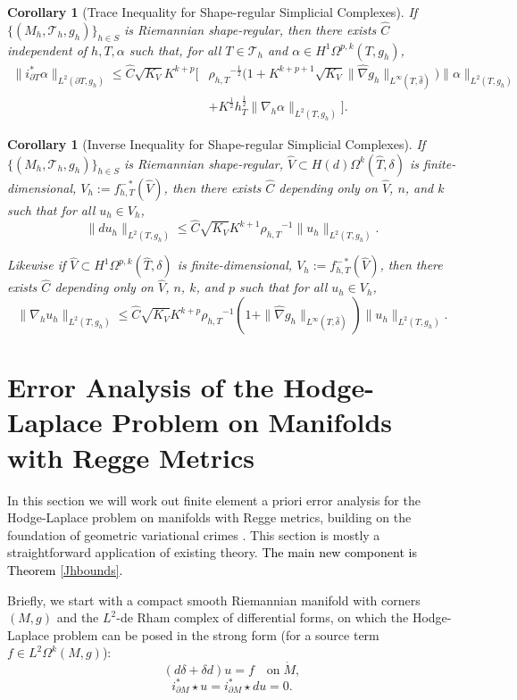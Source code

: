 \documentclass[11pt]{article}
\newtheorem{corollary}[theorem]{Corollary}
\newcommand{\correction}[2]{\textcolor{red}{}\textcolor{black}{#2}}
\begin{document}
\begin{corollary}[Trace Inequality for Shape-regular Simplicial Complexes]
\label{shaperegtrace}
If $\{(M_h,\mathcal{T}_h,g_h)\}_{h \in S}$ is Riemannian shape-regular, then there exists $\hat C$ independent of $h,T, \alpha$ such that, for all $T \in \mathcal{T}_h$ and $\alpha \in H^1\Omega^{p,k}(T,g_h)$,
\begin{align*}
\|i_{\partial T}^*\alpha\|_{L^2(\partial T,g_h)} \le \hat C \sqrt{K_V}K^{k+p}\Big[&{\rho_{h,T}}^{-\frac{1}{2}}\Big(1 + K^{k+p+1}\sqrt{K_V} \|\hat \nabla g_h\|_{L^\infty(T,\hat \delta)}\Big)\|\alpha\|_{L^2(T,g_h)} \\
&+ K^\frac{1}{2}h_T^\frac{1}{2}\|\nabla_h \alpha\|_{L^2(T,g_h)}\Big].
\end{align*}
\end{corollary}

\begin{corollary}[Inverse Inequality for Shape-regular Simplicial Complexes] \label{shapereginverse}
If $\{(M_h,\mathcal{T}_h,g_h)\}_{h \in S}$ is Riemannian shape-regular, $\hat V \subset H(d)\Omega^k(\hat T, \delta)$ is finite-dimensional, $V_h := f_{h,T}^{-*}(\hat V)$, then there exists $\hat C$ depending only on $\hat{V}$, $n$, and $k$ such that for all $u_h \in V_h$,
\[
\|du_h\|_{L^2(T,g_h)} \le \hat C \sqrt{K_V}K^{k+1}{\rho_{h,T}}^{-1}\|u_h\|_{L^2(T,g_h)}.
\]

Likewise if $\hat V \subset H^1\Omega^{p,k}(\hat T,\delta)$ is finite-dimensional, $V_h := f_{h,T}^{-*}(\hat V)$,  then there exists $\hat C$ depending only on $\hat{V}$, $n$, $k$, and $p$ such that for all $u_h \in V_h$,
\[
\|\nabla_h u_h\|_{L^2(T,g_h)} \le \hat C\sqrt{K_V}K^{k+p}{\rho_{h,T}}^{-1}\left(1 + \|\hat \nabla g_h\|_{L^\infty(T,\hat \delta)}\right)\|u_h\|_{L^2(T,g_h)}.
\]
\end{corollary}

\section{Error Analysis of the Hodge-Laplace Problem on Manifolds with Regge Metrics}
In this section we will work out finite element a priori error analysis for the Hodge-Laplace problem on manifolds with Regge metrics, building on the foundation of geometric variational crimes \cite{Holst-Stern}. This section is mostly a straightforward application of existing theory. \correction{}{The main new component is Theorem \ref{Jhbounds}.}

Briefly, we start with a compact smooth Riemannian manifold with corners $(M,g)$ and the $L^2$-de Rham complex of differential forms, on which the Hodge-Laplace problem can be posed in the strong form (for a source term $f \in L^2\Omega^k(M,g)$):
\begin{equation}\label{poisson_strong}
(d\delta + \delta d)u = f \quad \text{on}\; \mathring{M}, \end{equation}
\begin{equation}\label{poisson_strong_boundary}
i_{\partial M}^*\star u = i_{\partial M}^*\star du = 0.
\end{equation}
\end{document}
